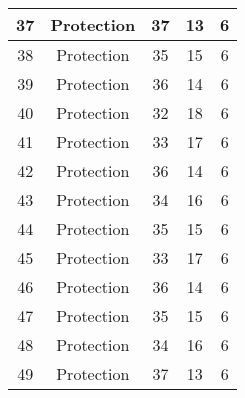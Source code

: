 \documentclass[results.tex]{subfiles}
\begin{document}
\begin{center}
\begin{tabular}{| c || c | c | c | c |}
            \hline
            37                      & Protection                   & 37                     & 13                      & 6                    \\
            \hline
            38                      & Protection                   & 35                     & 15                      & 6                    \\
            \hline
            39                      & Protection                   & 36                     & 14                      & 6                    \\
            \hline
            40                      & Protection                   & 32                     & 18                      & 6                    \\
            \hline
            41                      & Protection                   & 33                     & 17                      & 6                    \\
            \hline
            42                      & Protection                   & 36                     & 14                      & 6                    \\
            \hline
            43                      & Protection                   & 34                     & 16                      & 6                    \\
            \hline
            44                      & Protection                   & 35                     & 15                      & 6                    \\
            \hline
            45                      & Protection                   & 33                     & 17                      & 6                    \\
            \hline
            46                      & Protection                   & 36                     & 14                      & 6                    \\
            \hline
            47                      & Protection                   & 35                     & 15                      & 6                    \\
            \hline
            48                      & Protection                   & 34                     & 16                      & 6                    \\
            \hline
            49                      & Protection                   & 37                     & 13                      & 6                    \\
            \hline
        \end{tabular}
    \end{center}
\end{document}
